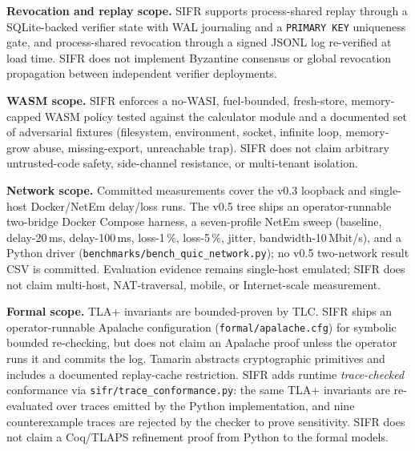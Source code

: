 \documentclass[runningheads]{llncs}
\begin{document}
\textbf{Revocation and replay scope.} SIFR supports process-shared replay
through a SQLite-backed verifier state with WAL journaling and a
\texttt{PRIMARY KEY} uniqueness gate, and process-shared revocation
through a signed JSONL log re-verified at load time. SIFR does not
implement Byzantine consensus or global revocation propagation between
independent verifier deployments.

\textbf{WASM scope.} SIFR enforces a no-WASI, fuel-bounded, fresh-store,
memory-capped WASM policy tested against the calculator module and a
documented set of adversarial fixtures (filesystem, environment, socket,
infinite loop, memory-grow abuse, missing-export, unreachable trap).
SIFR does not claim arbitrary untrusted-code safety, side-channel
resistance, or multi-tenant isolation.

\textbf{Network scope.} Committed measurements cover the v0.3 loopback and
single-host Docker/NetEm delay/loss runs. The v0.5 tree ships an
operator-runnable two-bridge Docker Compose harness, a seven-profile NetEm
sweep (baseline, delay-20\,ms, delay-100\,ms, loss-1\,\%, loss-5\,\%,
jitter, bandwidth-10\,Mbit/s), and a Python driver
(\texttt{benchmarks/bench\_quic\_network.py}); no v0.5 two-network result CSV
is committed. Evaluation evidence remains single-host emulated; SIFR does
not claim multi-host, NAT-traversal, mobile, or Internet-scale measurement.

\textbf{Formal scope.} TLA+ invariants are bounded-proven by TLC. SIFR
ships an operator-runnable Apalache configuration
(\texttt{formal/apalache.cfg}) for symbolic bounded re-checking, but
does not claim an Apalache proof unless the operator runs it and commits
the log. Tamarin abstracts cryptographic primitives and
includes a documented replay-cache restriction. SIFR adds runtime
\emph{trace-checked} conformance via
\texttt{sifr/trace\_conformance.py}: the same TLA+ invariants are
re-evaluated over traces emitted by the Python implementation, and
nine counterexample traces are rejected by the checker to prove
sensitivity. SIFR does not claim a Coq/TLAPS refinement proof from
Python to the formal models.
\end{document}
